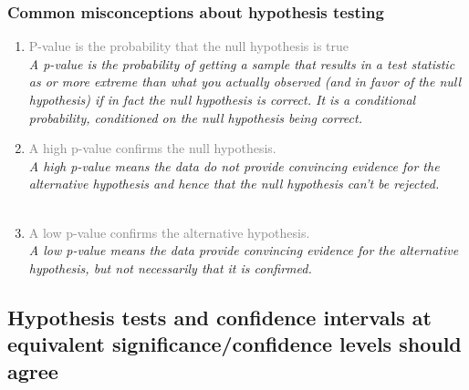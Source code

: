 \documentclass[slidestop,compress,mathserif,12pt,t,professionalfonts,xcolor=table]{beamer}
\begin{document}
\begin{frame}
\frametitle{Common misconceptions about hypothesis testing}

\begin{enumerate}

\item \textcolor{gray}{P-value is the probability that the null hypothesis is true} \\
\textit{A p-value is the probability of getting a sample that results in a test statistic 
as or more extreme than what you actually observed (and in favor of the null hypothesis) 
if in fact the null hypothesis is correct. It is a conditional probability, conditioned on the 
null hypothesis being correct.}

\pause

\item  \textcolor{gray}{A high p-value confirms the null hypothesis.}\\
\textit{A high p-value means the data do not provide convincing evidence for the alternative 
hypothesis and hence that the null hypothesis can't be rejected.} \\
$\:$ \\

\pause

\item   \textcolor{gray}{A low p-value confirms the alternative hypothesis.} \\
\textit{A low p-value means the data provide convincing evidence for the alternative hypothesis, 
but not necessarily that it is confirmed.} \\

\end{enumerate}

\end{frame}


\subsection{Hypothesis tests and confidence intervals at equivalent significance/confidence levels should agree}
\label{mi2}

\end{document}
